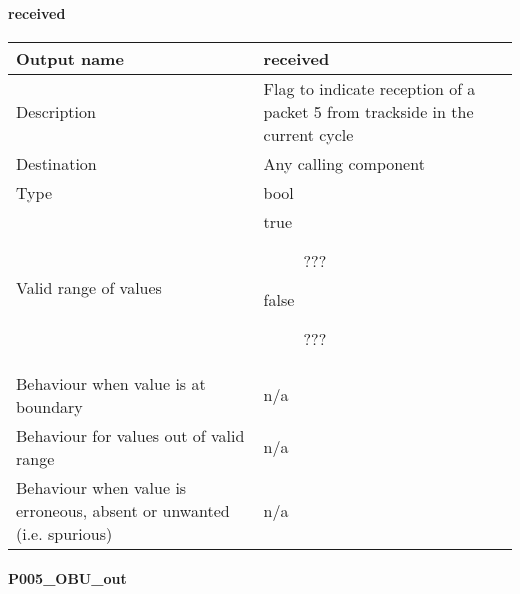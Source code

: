 \paragraph{received}
\begin{longtable}{p{}p{}}
\toprule
Output name				& received \\
\midrule
Description				& Flag to indicate reception of a packet 5 from trackside in the current cycle \\
\midrule
Destination				& Any calling component\\ 
\midrule
Type					& bool \\
\midrule
Valid range of values	&
\begin{description}
\item[true] ???
\item[false] ???
\end{description}
 \\
\midrule
Behaviour when value is at boundary	& n/a \\
\midrule
Behaviour for values out of valid range	& n/a \\
\midrule
Behaviour when value is erroneous, absent or unwanted (i.e. spurious) & n/a\\
\bottomrule
\end{longtable}


\paragraph{P005\_OBU\_out}

